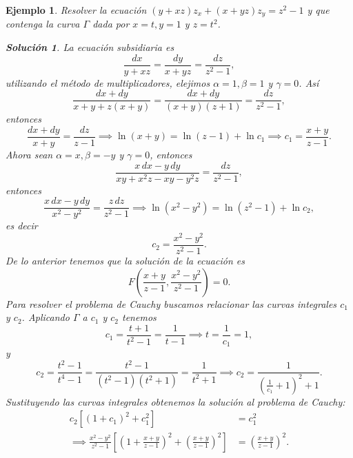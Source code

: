 \documentclass[11pt,letterpaper]{report}
\newtheorem{example}[defn]{Ejemplo}
\newtheorem*{sol}{Solución}
\newcommand\<{\langle}
\renewcommand\>{\rangle}
\begin{document}
\begin{example}
  Resolver la ecuación $(y+xz) z_x + (x+yz) z_y = z^2 - 1$ y
  que contenga la curva $\Gamma$ dada por $x = t, y = 1$ y
  $z = t^2$.
  \begin{sol}
    La ecuación subsidiaria es
    \[
    \frac{dx}{y+xz} = \frac{dy}{x+yz} = \frac{dz}{z^2-1},
    \] 
    utilizando el método de multiplicadores, elejimos
    $\alpha = 1, \beta = 1$ y $\gamma = 0$. Así
    \[
      \frac{dx+dy}{x+y+z(x+y)} = \frac{dx+dy}{(x+y)(z+1)} =
      \frac{dz}{z^2-1},
    \] 
    entonces
    \[
    \frac{dx+dy}{x+y} = \frac{dz}{z-1} \implies \ln(x+y) =
    \ln(z-1) + \ln c_1 \implies c_1 = \frac{x+y}{z-1}.
    \] 
    Ahora sean $\alpha = x, \beta = -y$ y $\gamma = 0$,
    entonces
    \[
    \frac{x \, dx - y \, dy}{xy + x^2z - xy - y^2z} =
    \frac{dz}{z^2-1},
    \] 
    entonces
    \[
    \frac{x \, dx - y \, dy}{x^2-y^2} = \frac{z \,
    dz}{z^2-1} \implies \ln(x^2-y^2) = \ln(z^2-1) + \ln c_2,
    \] 
    es decir
    \[
    c_2 = \frac{x^2-y^2}{z^2-1}.
    \] 
    De lo anterior tenemos que la solución de la ecuación es
    \[
    F\left(\frac{x+y}{z-1}, \frac{x^2-y^2}{z^2-1}\right) =
    0.
    \]
    Para resolver el problema de Cauchy buscamos relacionar
    las curvas integrales $c_1$ y $c_2$. Aplicando $\Gamma$ 
    a $c_1$ y $c_2$ tenemos
    \[
    c_1 = \frac{t+1}{t^2-1} = \frac{1}{t-1} \implies t =
    \frac{1}{c_1} = 1,
    \] 
    y
    \[
    c_2 = \frac{t^2-1}{t^4 - 1} =
    \frac{t^2-1}{(t^2-1)(t^2+1)} = \frac{1}{t^2+1} \implies
    c_2 = \frac{1}{\left(\frac{1}{c_1}+1\right)^2+1}.
    \] 
    Sustituyendo las curvas integrales obtenemos la solución
    al problema de Cauchy:
    \begin{align*}
      c_2 \left[(1+c_1)^2 + c_1^2\right] &= c_1^2\\
      \implies
      \frac{x^2-y^2}{z^2-1}\left[\left(1+\frac{x+y}{z-1}\right)^2
    + \left(\frac{x+y}{z-1}\right)^2 \right] &=
        \left(\frac{x+y}{z-1}\right)^2.
    \end{align*}
  \end{sol}
\end{example}
\end{document}
